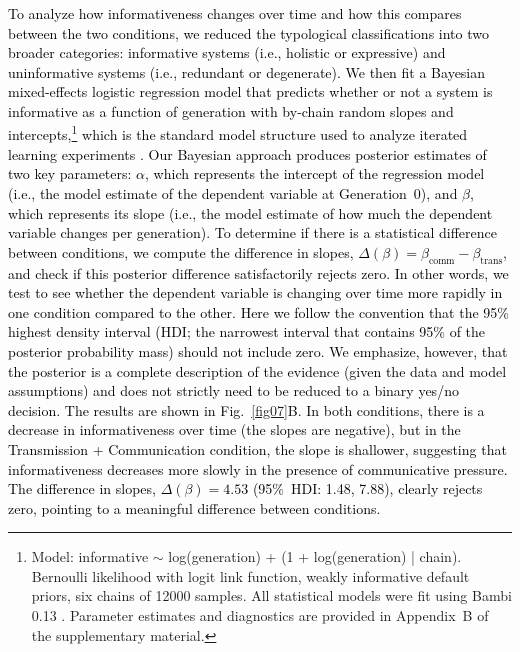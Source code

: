 \documentclass[doc,biblatex]{apa7}
\newcommand\firstrevision[1]{\textcolor{black}{#1}}
\newcommand\secondrevision[1]{\textcolor{black}{#1}}
\begin{document}
\firstrevision{To analyze how informativeness changes over time and how this compares between the two conditions, we reduced the typological classifications into two broader categories: informative systems (i.e., holistic or expressive) and uninformative systems (i.e., redundant or degenerate). We then fit a Bayesian mixed-effects logistic regression model that predicts whether or not a system is informative as a function of generation with by-chain random slopes and intercepts,\footnote{Model: informative $\sim$ log(generation) + (1 + log(generation) | chain). Bernoulli likelihood with logit link function, weakly informative default priors, six chains of 12000 samples. All statistical models were fit using Bambi 0.13 \parencite{Capretto:2022}. Parameter estimates and diagnostics are provided in Appendix~B of the supplementary material.} which is the standard model structure used to analyze iterated learning experiments \parencite{Winter:2016}. Our Bayesian approach produces posterior estimates of two key parameters: $\alpha$, which represents the intercept of the regression model \secondrevision{(i.e., the model estimate of the dependent variable at Generation~0)}, and $\beta$, which represents its slope \secondrevision{(i.e., the model estimate of how much the dependent variable changes per generation)}. To determine if there is a statistical difference between conditions, we compute the difference in slopes, $\Delta(\beta) = \beta_\mathrm{comm} - \beta_\mathrm{trans}$, and check if this posterior difference satisfactorily rejects zero. \secondrevision{In other words, we test to see whether the dependent variable is changing over time more rapidly in one condition compared to the other.} Here we follow the convention that the 95\% highest density interval (HDI; the narrowest interval that contains 95\% of the posterior probability mass) should not include zero. We emphasize, however, that the posterior is a complete description of the evidence (given the data and model assumptions) and does not strictly need to be reduced to a binary yes/no decision. The results are shown in Fig.~\ref{fig07}B. In both conditions, there is a decrease in informativeness over time (the slopes are negative), but in the Transmission + Communication condition, the slope is shallower, suggesting that informativeness decreases more slowly in the presence of communicative pressure. The difference in slopes, $\Delta(\beta) = 4.53$ (95\%~HDI: 1.48, 7.88), clearly rejects zero, pointing to a meaningful difference between conditions.}
\end{document}
